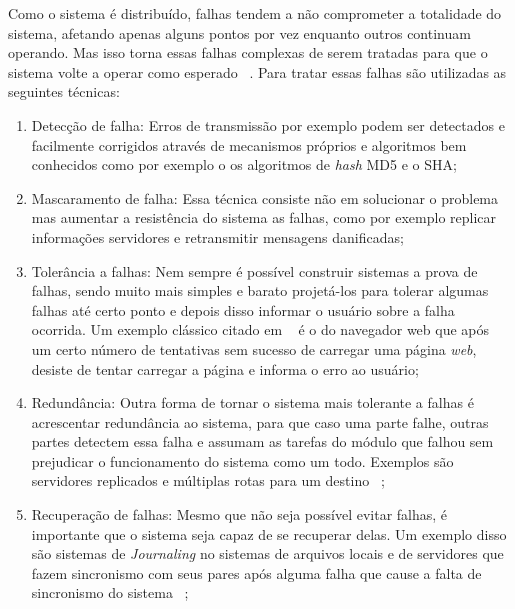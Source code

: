         Como o sistema é distribuído, falhas tendem a não comprometer a totalidade do sistema, afetando apenas alguns pontos  por vez enquanto outros continuam operando. Mas isso torna essas falhas complexas de serem tratadas para que o sistema volte a operar como esperado ~\cite{coulouris}. Para tratar essas falhas são utilizadas as seguintes técnicas:
        \begin{enumerate}
    
            \item Detecção de falha: Erros de transmissão por exemplo podem ser detectados e facilmente corrigidos através de mecanismos próprios e algoritmos bem conhecidos como por exemplo o os algoritmos de \textit{hash} MD5 e o SHA;
            
            \item Mascaramento de falha: Essa técnica consiste não em solucionar o problema mas aumentar a resistência do sistema as falhas, como por exemplo replicar informações servidores e retransmitir mensagens danificadas;
            
            \item Tolerância a falhas: Nem sempre é possível construir sistemas a prova de falhas, sendo muito mais simples e barato projetá-los para tolerar algumas falhas até certo ponto e depois disso informar o usuário sobre a falha ocorrida. Um exemplo clássico citado em ~\cite{coulouris} é o do navegador web que após um certo número de tentativas sem sucesso de carregar uma página \textit{web}, desiste de tentar carregar a página e informa o erro ao usuário;
            
            \item Redundância: Outra forma de tornar o sistema mais tolerante a falhas é acrescentar redundância ao sistema, para que caso uma parte falhe, outras partes detectem essa falha e assumam as tarefas do módulo que falhou sem prejudicar o funcionamento do sistema como um todo. Exemplos são servidores replicados e múltiplas rotas para um destino ~\cite{coulouris};
            
            \item Recuperação de falhas: Mesmo que não seja possível evitar falhas, é importante que o sistema seja capaz de se recuperar delas. Um exemplo disso são sistemas de \textit{Journaling} no sistemas de arquivos locais e de servidores que fazem sincronismo com seus pares após alguma falha que cause a falta de sincronismo do sistema ~\cite{coulouris};
            
        \end{enumerate}
    
